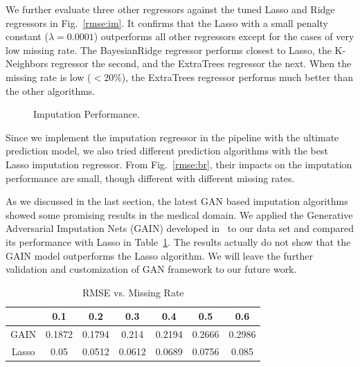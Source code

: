 We further evaluate three other regressors against the tuned Lasso and Ridge regressors in Fig.~\ref{rmse:im}. It confirms that the Lasso with a small 
penalty constant ($\lambda = 0.0001$) outperforms all other regressors except for the cases of very low missing rate. The BayesianRidge regressor performs 
closest to Lasso, the K-Neighbors regressor the second, and the ExtraTrees regressor the next. When the missing rate is low ($<20\%$), the ExtraTrees regressor 
performs much better than the other algorithms.

  \begin{figure}[!ht]
    \hfill
    \caption{Imputation Performance.}
    \label{fig:rmse}
  \end{figure}

Since we implement the imputation regressor in the pipeline with the ultimate prediction model, we also tried different prediction algorithms 
with the best Lasso imputation regressor. From Fig.~\ref{rmse:br}, their impacts on the imputation performance are small, though different 
with different missing rates.
 
As we discussed in the last section, the latest GAN based imputation algorithms showed some promising results in the medical domain. 
We applied the Generative Adversarial Imputation Nets (GAIN) developed in~\cite{Yoon2018GAINMD} to our data set and compared its performance 
with Lasso in Table~\ref{tab:gain}. The results actually do not show that the GAIN model outperforms the Lasso algorithm. We will leave the further validation and 
customization of GAN framework to our future work.
  
 \begin{table}[!ht]
\caption{RMSE vs. Missing Rate}
\label{tab:gain}
\begin{center}
\begin{tabular}{ |c|c|c|c|c|c|c| } 
 \hline
  & 0.1 & 0.2 & 0.3 & 0.4 & 0.5 & 0.6\\ 
 \hline
  \hline
 GAIN & 0.1872 & 0.1794 & 0.214 & 0.2194 & 0.2666 & 0.2986 \\ 
 \hline
 Lasso & 0.05 & 0.0512 & 0.0612 & 0.0689 &0.0756 & 0.085\\
 \hline
\end{tabular}
\end{center}
\end{table} 

